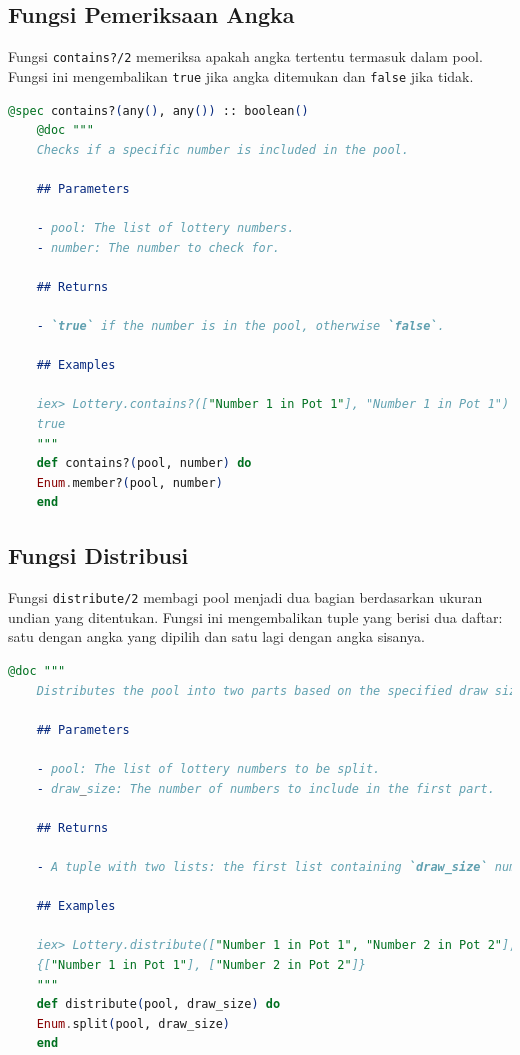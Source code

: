 \subsection{Fungsi Pemeriksaan Angka}

Fungsi \texttt{contains?/2} memeriksa apakah angka tertentu termasuk dalam pool. Fungsi ini mengembalikan \texttt{true} jika angka ditemukan dan \texttt{false} jika tidak.

\begin{lstlisting}[language=elixir, caption={Fungsi Pemeriksaan Angka}]
	@spec contains?(any(), any()) :: boolean()
	@doc """
	Checks if a specific number is included in the pool.
	
	## Parameters
	
	- pool: The list of lottery numbers.
	- number: The number to check for.
	
	## Returns
	
	- `true` if the number is in the pool, otherwise `false`.
	
	## Examples
	
	iex> Lottery.contains?(["Number 1 in Pot 1"], "Number 1 in Pot 1")
	true
	"""
	def contains?(pool, number) do
	Enum.member?(pool, number)
	end
\end{lstlisting}

\subsection{Fungsi Distribusi}

Fungsi \texttt{distribute/2} membagi pool menjadi dua bagian berdasarkan ukuran undian yang ditentukan. Fungsi ini mengembalikan tuple yang berisi dua daftar: satu dengan angka yang dipilih dan satu lagi dengan angka sisanya.

\begin{lstlisting}[language=elixir, caption={Fungsi Distribusi}]
	@doc """
	Distributes the pool into two parts based on the specified draw size.
	
	## Parameters
	
	- pool: The list of lottery numbers to be split.
	- draw_size: The number of numbers to include in the first part.
	
	## Returns
	
	- A tuple with two lists: the first list containing `draw_size` numbers, and the second list containing the remaining numbers.
	
	## Examples
	
	iex> Lottery.distribute(["Number 1 in Pot 1", "Number 2 in Pot 2"], 1)
	{["Number 1 in Pot 1"], ["Number 2 in Pot 2"]}
	"""
	def distribute(pool, draw_size) do
	Enum.split(pool, draw_size)
	end
\end{lstlisting}


